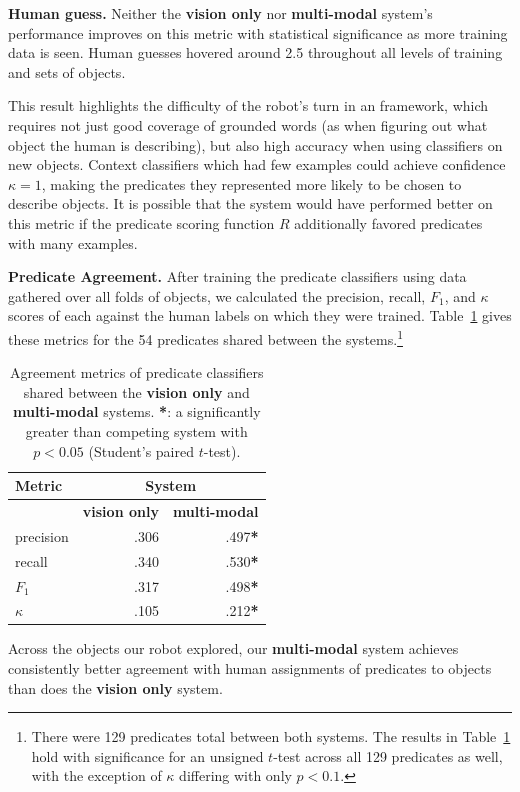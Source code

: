 \textbf{Human guess.} Neither the \textbf{vision only} nor \textbf{multi-modal} system's performance improves on this metric with statistical significance as more training data is seen.
Human guesses hovered around 2.5 throughout all levels of training and sets of objects.

This result highlights the difficulty of the robot's turn in an \ispy framework, which requires not just good coverage of grounded words (as when figuring out what object the human is describing), but also high accuracy when using classifiers on new objects.
Context classifiers which had few examples could achieve confidence $\kappa=1$, making the predicates they represented more likely to be chosen to describe objects.
It is possible that the system would have performed better on this metric if the predicate scoring function $R$ additionally favored predicates with many examples.

\textbf{Predicate Agreement.} After training the predicate classifiers using data gathered over all folds of objects, we calculated the precision, recall, $F_1$, and $\kappa$ scores of each against the human labels on which they were trained.
Table~\ref{tab:predicate_results} gives these metrics for the 54 predicates shared between the systems.\footnote{There were 129 predicates total between both systems.
The results in Table~\ref{tab:predicate_results} hold with significance for an unsigned $t$-test across all 129 predicates as well, with the exception of $\kappa$ differing with only $p<0.1$.}

\begin{table}
\centering
\begin{tabular}[h]{|l|r|r|}
	\hline
	\bf Metric & \multicolumn{2}{c|}{\bf System} \\ \hline \hline
	& \bf vision only & \bf multi-modal \\ \hline
	precision & .306 & .497\textbf{*} \\
	recall & .340 & .530\textbf{*} \\
	\bf $F_1$ & .317 & .498\textbf{*} \\
	\bf $\kappa$ & .105 & .212\textbf{*} \\ \hline
\end{tabular}
\caption{Agreement metrics of predicate classifiers shared between the \textbf{vision only} and \textbf{multi-modal} systems.
\textbf{*}: a significantly greater than competing system with $p<0.05$ (Student's paired $t$-test).}
\label{tab:predicate_results}
\end{table}

Across the objects our robot explored, our \textbf{multi-modal} system achieves consistently better agreement with human assignments of predicates to objects than does the \textbf{vision only} system.
